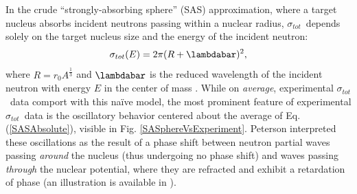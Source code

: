 \documentclass[twocolumn,secnumarabic,amssymb, nobibnotes, aps, prl,
superscriptaddress, nobalancelastpage, draft]{revtex4}
\newcommand{\tot}{\ensuremath{\sigma_{tot}}}
\newcommand{\totRD}{\ensuremath{\sigma_{A,A'}}(E)}
\begin{document}
In the crude ``strongly-absorbing sphere'' (SAS) approximation, where a target
nucleus absorbs incident neutrons passing within a nuclear radius,
\tot\ depends solely on the target nucleus size and the energy of the incident neutron:
\begin{equation} \label{SASAbsolute}
    \sigma_{tot}(E) = 2\pi(R + \lambdabar)^{2},
\end{equation}
where $R=r_{0}A^{\frac{1}{3}}$ and $\lambdabar$ is the reduced wavelength
of the incident neutron with energy $E$ in the center of mass \cite{Fernbach1949, Satchler1980}. 
While on \textit{average}, experimental \tot\ data comport with this na\"ive
model, the most prominent feature of experimental \tot\ data is the oscillatory
behavior centered about the average of Eq. (\ref{SASAbsolute}), visible in Fig.
\ref{SASphereVsExperiment}. Peterson \cite{Peterson1962} interpreted these oscillations as the 
result of a phase shift between neutron partial waves passing \textit{around} the 
nucleus (thus undergoing no phase shift) and waves passing
\textit{through} the nuclear potential, where they are refracted and exhibit a 
retardation of phase (an illustration is available in \cite{Satchler1980}).
\end{document}

